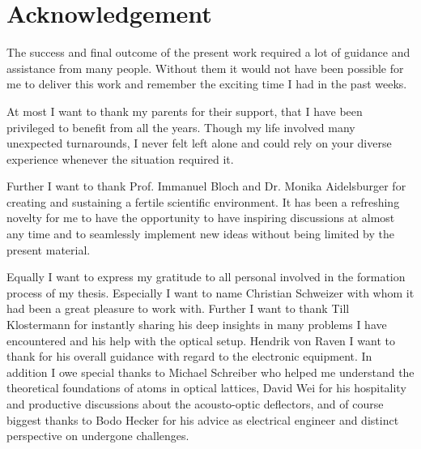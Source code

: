 \chapter*{Acknowledgement}

The success and final outcome of the present work required a lot of guidance
and assistance from many people. Without them it would not have been possible
for me to deliver this work and remember the exciting time I had in the past
weeks.

At most I want to thank my parents for their support, that I have been
privileged to benefit from all the years. Though my life involved many
unexpected turnarounds, I never felt left alone and could rely on your
diverse experience whenever the situation required it.

Further I want to thank Prof. Immanuel Bloch and Dr. Monika Aidelsburger for
creating and sustaining a fertile scientific environment. It has been a
refreshing novelty for me to have the opportunity to have inspiring
discussions at almost any time and to seamlessly implement new ideas without
being limited by the present material.

Equally I want to express my gratitude to all personal involved in the
formation process of my thesis. Especially I want to name Christian Schweizer
with whom it had been a great pleasure to work with. Further I want to thank
Till Klostermann for instantly sharing his deep insights in many problems I
have encountered and his help with the optical setup. Hendrik von Raven I want
to thank for his overall guidance with regard to the electronic equipment.
In addition I owe special thanks to Michael Schreiber who helped me understand
the theoretical foundations of atoms in optical lattices, David Wei for his
hospitality and productive discussions about the acousto-optic deflectors,
and of course biggest thanks to Bodo Hecker for his advice as electrical
engineer and distinct perspective on undergone challenges.

